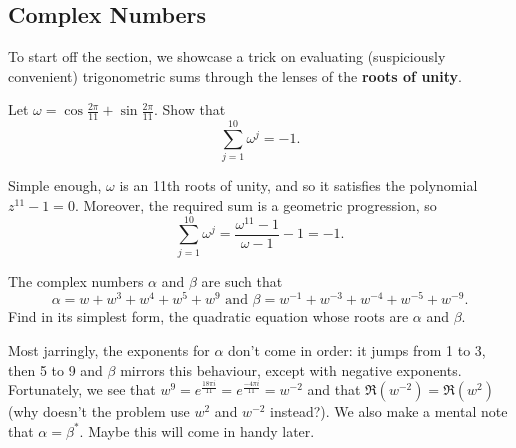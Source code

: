 \documentclass[../main.tex]{subfiles}
\begin{document}
\subsection{Complex Numbers}
To start off the section, we showcase a trick on evaluating (suspiciously convenient) trigonometric sums through the lenses of the \textbf{roots of unity}.
\begin{example}
Let $\omega=\cos{\frac{2\pi}{11}}+\sin{\frac{2\pi}{11}}$.
Show that $$\sum_{j=1}^{10} \omega^{j}=-1.$$
\end{example}
Simple enough, $\omega$ is an 11th roots of unity, and so it satisfies the polynomial $z^{11}-1=0$. Moreover, the required sum is a geometric progression, so
$$\sum_{j=1}^{10} \omega^{j}=\frac{\omega^{11}-1}{\omega-1}-1=-1.$$

\begin{example}[cont.]
The complex numbers $\alpha$ and $\beta$ are such that
$$\alpha=w+w^3+w^4+w^5+w^9 \text{ and } \beta=w^{-1}+w^{-3}+w^{-4}+w^{-5}+w^{-9}.$$
Find in its simplest form, the quadratic equation whose roots are $\alpha$ and $\beta$.
\end{example}
Most jarringly, the exponents for $\alpha$ don't come in order: it jumps from 1 to 3, then 5 to 9 and $\beta$ mirrors this behaviour, except with negative exponents. Fortunately, we see that $w^9=e^{\frac{18\pi i}{11}}=e^{\frac{-4\pi i}{11}}=w^{-2}$ and that $\Re(w^{-2})=\Re(w^2)$ (why doesn't the problem use $w^2$ and $w^{-2}$ instead?). We also make a mental note that $\alpha=\beta^{*}$. Maybe this will come in handy later.
\end{document}
